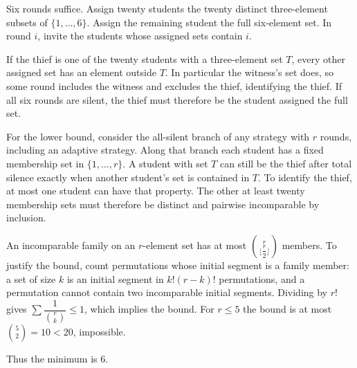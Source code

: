 Six rounds suffice. Assign twenty students the twenty distinct three-element subsets of $\{1,\ldots,6\}$. Assign the remaining student the full six-element set. In round $i$, invite the students whose assigned sets contain $i$.

If the thief is one of the twenty students with a three-element set $T$, every other assigned set has an element outside $T$. In particular the witness's set does, so some round includes the witness and excludes the thief, identifying the thief. If all six rounds are silent, the thief must therefore be the student assigned the full set.

For the lower bound, consider the all-silent branch of any strategy with $r$ rounds, including an adaptive strategy. Along that branch each student has a fixed membership set in $\{1,\ldots,r\}$. A student with set $T$ can still be the thief after total silence exactly when another student's set is contained in $T$. To identify the thief, at most one student can have that property. The other at least twenty membership sets must therefore be distinct and pairwise incomparable by inclusion.

An incomparable family on an $r$-element set has at most $\binom r{\lfloor \dfrac{r}{2}\rfloor}$ members. To justify the bound, count permutations whose initial segment is a family member: a set of size $k$ is an initial segment in $k!(r-k)!$ permutations, and a permutation cannot contain two incomparable initial segments. Dividing by $r!$ gives $\sum \dfrac{1}{\binom r k}\le1$, which implies the bound. For $r\le5$ the bound is at most $\binom52=10<20$, impossible.

Thus the minimum is $\boxed6$.
